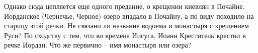 
Однако сюда цепляется еще одного предание, о крещении киевлян в Почайне. Иорданское (Чернечье, Черное) озеро впадало в Почайну, а по виду походило на старицу этой речки. Не связано ли название водоема и монастыря с крещением Руси? По сходству с тем, что во времена Иисуса, Иоанн Креститель крестил в речке Иордан. Что же первично – имя монастыря или озера?
